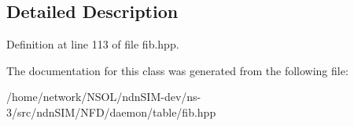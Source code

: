 \subsection{Detailed Description}


Definition at line 113 of file fib.\+hpp.



The documentation for this class was generated from the following file\+:\begin{DoxyCompactItemize}
\item 
/home/network/\+N\+S\+O\+L/ndn\+S\+I\+M-\/dev/ns-\/3/src/ndn\+S\+I\+M/\+N\+F\+D/daemon/table/fib.\+hpp\end{DoxyCompactItemize}
